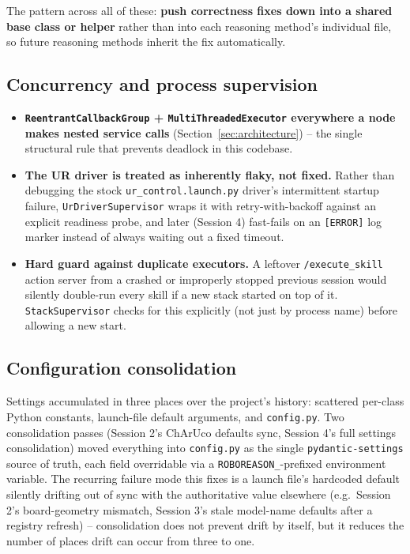 The pattern across all of these: \textbf{push correctness fixes down into a
shared base class or helper} rather than into each reasoning method's
individual file, so future reasoning methods inherit the fix automatically.

\subsection{Concurrency and process supervision}

\begin{itemize}[nosep]
  \item \textbf{\texttt{ReentrantCallbackGroup} + \texttt{MultiThreadedExecutor}
    everywhere a node makes nested service calls} (Section~\ref{sec:architecture}) --
    the single structural rule that prevents deadlock in this codebase.
  \item \textbf{The UR driver is treated as inherently flaky, not fixed.}
    Rather than debugging the stock \texttt{ur\_control.launch.py} driver's
    intermittent startup failure, \texttt{UrDriverSupervisor} wraps it with
    retry-with-backoff against an explicit readiness probe, and later
    (Session 4) fast-fails on an \texttt{[ERROR]} log marker instead of
    always waiting out a fixed timeout.
  \item \textbf{Hard guard against duplicate executors.} A leftover
    \texttt{/execute\_skill} action server from a crashed or improperly
    stopped previous session would silently double-run every skill if a new
    stack started on top of it. \texttt{StackSupervisor} checks for this
    explicitly (not just by process name) before allowing a new start.
\end{itemize}

\subsection{Configuration consolidation}

Settings accumulated in three places over the project's history: scattered
per-class Python constants, launch-file default arguments, and
\texttt{config.py}. Two consolidation passes (Session 2's ChArUco defaults
sync, Session 4's full settings consolidation) moved everything into
\texttt{config.py} as the single \texttt{pydantic-settings} source of truth,
each field overridable via a \texttt{ROBOREASON\_}-prefixed environment
variable. The recurring failure mode this fixes is a launch file's hardcoded
default silently drifting out of sync with the authoritative value elsewhere
(e.g.\ Session 2's board-geometry mismatch, Session 3's stale model-name
defaults after a registry refresh) -- consolidation does not prevent drift by
itself, but it reduces the number of places drift can occur from three to
one.
